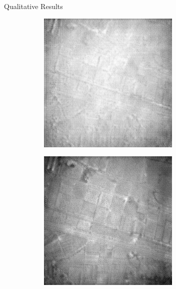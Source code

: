 \documentclass[final]{beamer}
\newlength{\colwidth}
\begin{document}
\begin{frame}[t]
\begin{columns}[t]
\begin{column}{\colwidth}
\begin{block}{Qualitative Results}
\begin{figure}
\begin{subfigure}[b]{0.19\textwidth}
            \includegraphics[width=\textwidth]{../figs/outputs/cycleGan/71.png}
        \end{subfigure}
        \hfill
        \begin{subfigure}[b]{0.19\textwidth}
            \centering
            \includegraphics[width=\textwidth]{../figs/outputs/cut/71.png}

\end{subfigure}
\end{figure}
\end{block}
\end{column}
\end{columns}
\end{frame}
\end{document}

